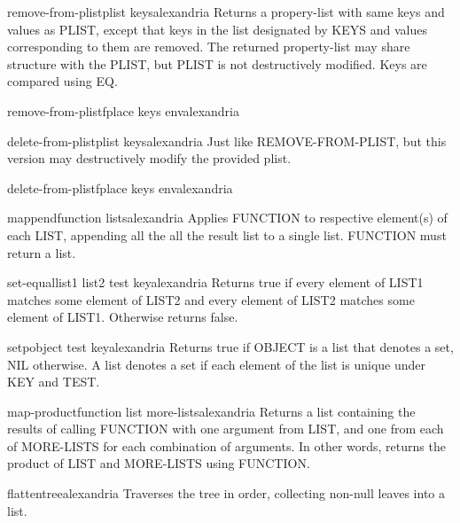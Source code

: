 \begin{function}{remove-from-plist}{plist \rest keys}{alexandria}{}
  Returns a propery-list with same keys and values as PLIST, except that keys
in the list designated by KEYS and values corresponding to them are removed.
The returned property-list may share structure with the PLIST, but PLIST is
not destructively modified. Keys are compared using EQ.
\end{function}

\begin{macro}{remove-from-plistf}{place \rest keys \env env}{alexandria}{}
  
\end{macro}

\begin{function}{delete-from-plist}{plist \rest keys}{alexandria}{}
  Just like REMOVE-FROM-PLIST, but this version may destructively modify the
provided plist.
\end{function}

\begin{macro}{delete-from-plistf}{place \rest keys \env env}{alexandria}{}
  
\end{macro}

\begin{function}{mappend}{function \rest lists}{alexandria}{}
  Applies FUNCTION to respective element(s) of each LIST, appending all the
all the result list to a single list. FUNCTION must return a list.
\end{function}

\begin{function}{set-equal}{list1 list2 \key test key}{alexandria}{}
  Returns true if every element of LIST1 matches some element of LIST2 and
every element of LIST2 matches some element of LIST1. Otherwise returns false.
\end{function}

\begin{function}{setp}{object \key test key}{alexandria}{}
  Returns true if OBJECT is a list that denotes a set, NIL otherwise. A list
denotes a set if each element of the list is unique under KEY and TEST.
\end{function}

\begin{function}{map-product}{function list \rest more-lists}{alexandria}{}
  Returns a list containing the results of calling FUNCTION with one argument
from LIST, and one from each of MORE-LISTS for each combination of arguments.
In other words, returns the product of LIST and MORE-LISTS using FUNCTION.
\end{function}

\begin{function}{flatten}{tree}{alexandria}{}
  Traverses the tree in order, collecting non-null leaves into a list.
\end{function}

